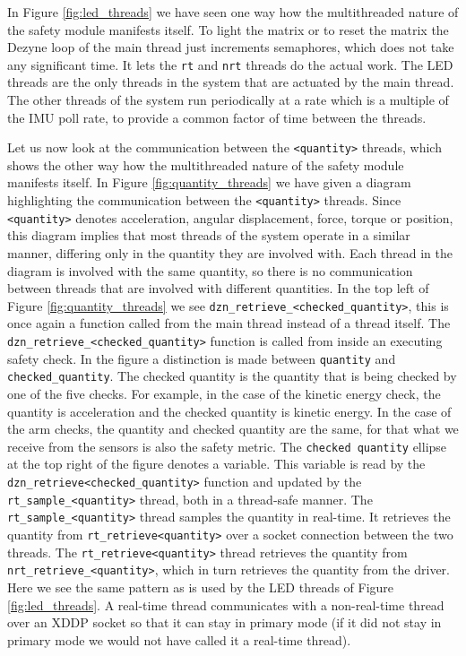 \documentclass[12pt]{scrreprt}
\begin{document}
In Figure \ref{fig:led_threads} we have seen one way how the multithreaded nature of the safety module manifests itself. To light the matrix or to reset the matrix the Dezyne loop of the main thread just increments semaphores, which does not take any significant time. It lets the \texttt{rt} and \texttt{nrt} threads do the actual work. The LED threads are the only threads in the system that are actuated by the main thread. The other threads of the system run periodically at a rate which is a multiple of the IMU poll rate, to provide a common factor of time between the threads.
\par
Let us now look at the communication between the \texttt{<quantity>} threads, which shows the other way how the multithreaded nature of the safety module manifests itself. In Figure \ref{fig:quantity_threads} we have given a diagram highlighting the communication between the \texttt{<quantity>} threads. Since \texttt{<quantity>} denotes acceleration, angular displacement, force, torque or position, this diagram implies that most threads of the system operate in a similar manner, differing only in the quantity they are involved with. Each thread in the diagram is involved with the same quantity, so there is no communication between threads that are involved with different quantities. In the top left of Figure \ref{fig:quantity_threads} we see \texttt{dzn\_retrieve\_<checked\_quantity>}, this is once again a function called from the main thread instead of a thread itself. The \texttt{dzn\_retrieve\_<checked\_quantity>} function is called from inside an executing safety check. In the figure a distinction is made between \texttt{quantity} and \texttt{checked\_quantity}. The checked quantity is the quantity that is being checked by one of the five checks. For example, in the case of the kinetic energy check, the quantity is acceleration and the checked quantity is kinetic energy. In the case of the arm checks, the quantity and checked quantity are the same, for that what we receive from the sensors is also the safety metric. The \texttt{checked quantity} ellipse at the top right of the figure denotes a variable. This variable is read by the \texttt{dzn\_retrieve<checked\_quantity>} function and updated by the \texttt{rt\_sample\_<quantity>} thread, both in a thread-safe manner. The \texttt{rt\_sample\_<quantity>} thread samples the quantity in real-time. It retrieves the quantity from \texttt{rt\_retrieve<quantity>} over a socket connection between the two threads. The \texttt{rt\_retrieve<quantity>} thread retrieves the quantity from \texttt{nrt\_retrieve\_<quantity>}, which in turn retrieves the quantity from the driver. Here we see the same pattern as is used by the LED threads of Figure \ref{fig:led_threads}. A real-time thread communicates with a non-real-time thread over an XDDP socket so that it can stay in primary mode (if it did not stay in primary mode we would not have called it a real-time thread).
\end{document}
